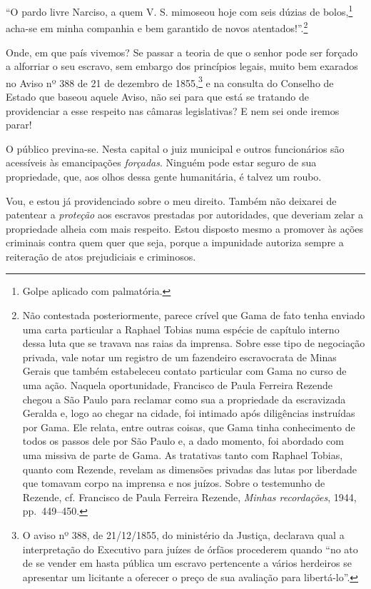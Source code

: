 ``O pardo livre Narciso, a quem V. S. mimoseou hoje com seis dúzias de
bolos,\footnote{ Golpe aplicado com palmatória.} acha-se em minha
companhia e bem garantido de novos atentados!''.\footnote{ Não
  contestada posteriormente, parece crível que Gama de fato tenha
  enviado uma carta particular a Raphael Tobias numa espécie de capítulo
  interno dessa luta que se travava nas raias da imprensa. Sobre esse
  tipo de negociação privada, vale notar um registro de um fazendeiro
  escravocrata de Minas Gerais que também estabeleceu contato particular
  com Gama no curso de uma ação. Naquela oportunidade, Francisco de
  Paula Ferreira Rezende chegou a São Paulo para reclamar como sua a
  propriedade da escravizada Geralda e, logo ao chegar na cidade, foi
  intimado após diligências instruídas por Gama. Ele relata, entre
  outras coisas, que Gama tinha conhecimento de todos os passos dele por
  São Paulo e, a dado momento, foi abordado com uma missiva de parte de
  Gama. As tratativas tanto com Raphael Tobias, quanto com Rezende,
  revelam as dimensões privadas das lutas por liberdade que tomavam
  corpo na imprensa e nos juízos. Sobre o testemunho de Rezende, cf.
  Francisco de Paula Ferreira Rezende, \emph{Minhas recordações}, 1944,
  pp.~449--450.}

Onde, em que país vivemos? Se passar a teoria de que o senhor pode ser
forçado a alforriar o seu escravo, sem embargo dos princípios legais,
muito bem exarados no Aviso nº 388 de 21 de dezembro de 1855,\footnote{
  O aviso nº 388, de 21/12/1855, do ministério da Justiça, declarava
  qual a interpretação do Executivo para juízes de órfãos procederem
  quando ``no ato de se vender em hasta pública um escravo pertencente a
  vários herdeiros se apresentar um licitante a oferecer o preço de sua
  avaliação para libertá-lo''.} e na consulta do Conselho de Estado que
baseou aquele Aviso, não sei para que está se tratando de providenciar a
esse respeito nas câmaras legislativas? E nem sei onde iremos parar!

O público previna-se. Nesta capital o juiz municipal e outros
funcionários são acessíveis às emancipações \emph{forçadas}. Ninguém
pode estar seguro de sua propriedade, que, aos olhos dessa gente
humanitária, é talvez um roubo.

Vou, e estou já providenciado sobre o meu direito. Também não deixarei
de patentear a \emph{proteção} aos escravos prestadas por autoridades,
que deveriam zelar a propriedade alheia com mais respeito. Estou
disposto mesmo a promover às ações criminais contra quem quer que seja,
porque a impunidade autoriza sempre a reiteração de atos prejudiciais e
criminosos.

